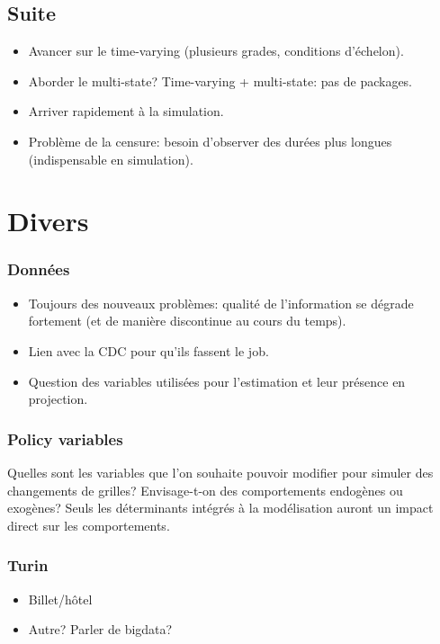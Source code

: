 \documentclass[11pt,a4paper]{article}
\begin{document}
\subsection*{Suite}

\begin{itemize}[leftmargin=1cm ,parsep=0cm,itemsep=0cm,topsep=0cm] 
\item Avancer sur le time-varying (plusieurs grades, conditions d'échelon). 
\item Aborder le multi-state? Time-varying + multi-state: pas de packages. 
\item Arriver rapidement à la simulation. 
\item Problème de la censure: besoin d'observer des durées plus longues (indispensable en simulation). 
\end{itemize}


\section{Divers}

\subsubsection*{Données}

\begin{itemize}[leftmargin=1cm ,parsep=0cm,itemsep=0cm,topsep=0cm] 
\item Toujours des nouveaux problèmes: qualité de l'information se dégrade fortement (et de manière discontinue au cours du temps). 
\item Lien avec la CDC pour qu'ils fassent le job. 
\item Question des variables utilisées pour l'estimation et leur présence en projection. 
\end{itemize}

\subsubsection*{Policy variables}

Quelles sont les variables que l'on souhaite pouvoir modifier pour simuler des changements de grilles? Envisage-t-on des comportements endogènes ou exogènes? Seuls les déterminants  intégrés à la modélisation auront un impact direct sur les comportements. 



\subsubsection*{Turin}

\begin{itemize}[leftmargin=1cm ,parsep=0cm,itemsep=0cm,topsep=0cm] 
\item Billet/hôtel
\item Autre? Parler de bigdata?
\end{itemize}
\end{document}
